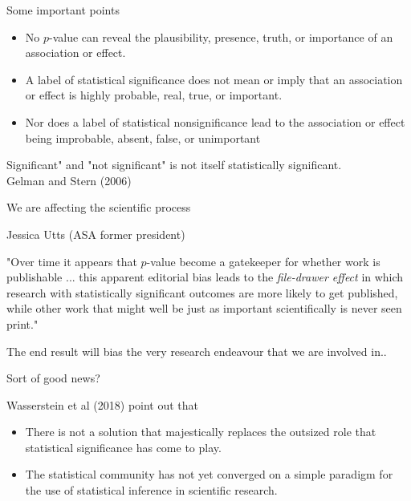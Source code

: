 \documentclass{beamer}
\begin{document}
\begin{frame}{Some important points}

\begin{itemize}
	\item No $p$-value can reveal the plausibility, presence,
	truth, or importance of an association or effect. 
	\item  A label of statistical significance does not mean or imply that an
	association or effect is highly probable, real, true, or important.
	\item Nor does a label of statistical nonsignificance lead to the association
	or effect being improbable, absent, false, or unimportant
\end{itemize}

\begin{displayquote}
	Significant" and "not significant" is not itself statistically significant.\\
	
	Gelman and Stern (2006)

\end{displayquote}


\end{frame}

\begin{frame}{We are affecting the scientific process}

Jessica Utts (ASA former president)

"Over time it appears that $p$-value become a gatekeeper for whether work is publishable ... this apparent editorial bias leads to the \textit{file-drawer effect} in which research with statistically significant outcomes are more likely to get published, while other work that might well be just as important scientifically is never seen print."

The end result will bias the very research endeavour that we are involved in..

\end{frame}

\begin{frame}{Sort of good news?}

Wasserstein et al (2018) point out that 

\begin{itemize}
	\item There is not a solution that majestically replaces the outsized role that statistical significance has come to play.
	\item The statistical community has not yet converged on a simple paradigm for the use of statistical inference in scientific research.
\end{itemize}

\end{frame}
\end{document}
